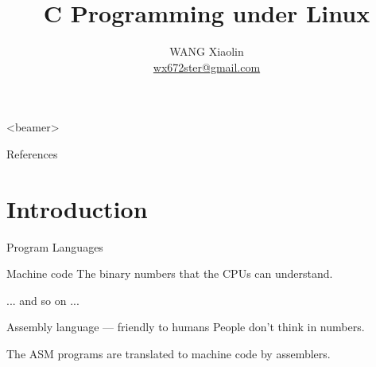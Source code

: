 





\begin{frame}<beamer>
  \title{C Programming under Linux}
  \author{WANG Xiaolin\\{\small \url{wx672ster@gmail.com}}}
  \titlepage
\end{frame}

\begin{frame}{References}
  \begin{small}
    \begin{refsection}
      \nocite{stevens2013advanced, raymond2003art, matthew2008beginning, kernighan2006c,
        king2008c, reek1997pointers, weiss1993data, waite1987c}
      \printbibliography[heading=none]
    \end{refsection}
  \end{small}
\end{frame}

\section{Introduction}

\begin{frame}{Program Languages}
  \begin{block}{Machine code}
    The \alert{binary numbers} that the CPUs can understand.
    \begin{center}{ ... and so on ...}
    \end{center}
  \end{block}
  \begin{block}{Assembly language --- friendly to humans}
    People don't think in numbers.
    \begin{center}
    \end{center}
    The ASM programs are translated to machine code by \alert{assemblers}.
  \end{block}
\end{frame}

